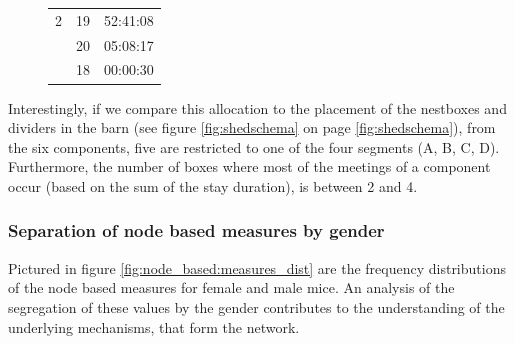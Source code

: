 \begin{figure}[p]
\begin{center}
\begin{tabular}{lll}
2	& 19	& 52:41:08 \\
	& 20	& 05:08:17 \\
	& 18	& 00:00:30 \\\hline

\end{tabular}
\label{tab:comp_box_meet_dist}
\end{center}
\end{figure} 

Interestingly, if we compare this allocation to the placement of the nestboxes and dividers in the barn (see figure \ref{fig:shedschema} on page \ref{fig:shedschema}), from the six components, five are restricted to one of the four segments (A, B, C, D). Furthermore, the number of boxes where most of the meetings of a component occur (based on the sum of the stay duration), is between 2 and 4. 
 
\subsubsection{Separation of node based measures by gender}
\label{subsubsec:nbm_dist}

Pictured in figure \ref{fig:node_based:measures_dist} are the frequency distributions of the node based measures for female and male mice. An analysis of the segregation of these values by the gender contributes to the understanding of the underlying mechanisms, that form the network.


